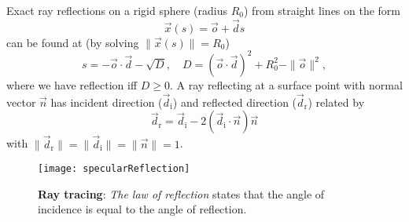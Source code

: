 Exact ray reflections on a rigid sphere (radius $R_0$) from straight lines on the form
\begin{equation*}
	\vec{x}(s) = \vec{o} + \vec{d}s
\end{equation*}
can be found at (by solving $\|\vec{x}(s)\| = R_0$)
\begin{equation*}
	s = -\vec{o}\cdot \vec{d} - \sqrt{D},\quad D = (\vec{o}\cdot \vec{d})^2 + R_0^2-\|\vec{o}\|^2,
\end{equation*}
where we have reflection iff $D\geq 0$. A ray reflecting at a surface point with normal vector $\vec{n}$ has incident direction ($\vec{d}_{\mathrm{i}}$) and reflected direction ($\vec{d}_{\mathrm{r}}$) related by
\begin{equation*}
	\vec{d}_{\mathrm{r}} = \vec{d}_{\mathrm{i}} - 2(\vec{d}_{\mathrm{i}}\cdot\vec{n})\vec{n}
\end{equation*}
with $\|\vec{d}_{\mathrm{r}}\| = \|\vec{d}_{\mathrm{i}}\| = \|\vec{n}\| = 1$.
\begin{figure}
	\centering
	\texttt{[image: specularReflection]}
	\caption{\textbf{Ray tracing}: \textit{The law of reflection} states that the angle of incidence is equal to the angle of reflection.}
\end{figure}

